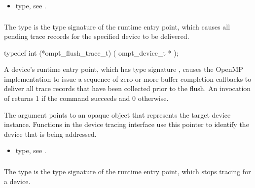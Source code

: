 \crossreferences
\begin{itemize}
\item {} type, see .
\end{itemize}



\subsubsection{}
\label{sec:ompt_flush_trace_t}

\summary
The  type is the type signature of the 
 runtime entry point, which causes all 
pending trace records for the specified device to be delivered.

\format
\begin{ccppspecific}
\begin{omptInquiry}
typedef int (*ompt_flush_trace_t) (
  ompt_device_t *
);
\end{omptInquiry}
\end{ccppspecific}

\descr
A device's  runtime entry point, which has type
signature , causes the OpenMP implementation to 
issue a sequence of zero or more buffer completion callbacks to deliver 
all trace records that have been collected prior to the flush. An invocation 
of  returns 1 if the command succeeds and 0 otherwise.

\argdesc
The  argument points to an opaque object that represents
the target device instance. Functions in the device tracing interface
use this pointer to identify the device that is being addressed.

\crossreferences
\begin{itemize}
\item {} type, see .
\end{itemize}



\subsubsection{}
\label{sec:ompt_stop_trace_t}

\summary
The  type is the type signature of the 
 runtime entry point, which stops tracing for a device.

